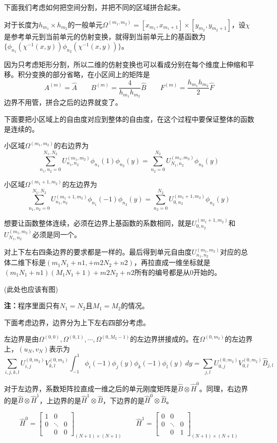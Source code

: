\documentclass[UTF8,12pt]{article}
\begin{document}
下面我们考虑如何把空间分割，并把不同的区域拼合起来。

对于长度为$h_{m_1} \times h_{m_2}$的一般单元$\Omega^{(m_1, m_2)} = [x_{m_1}, x_{m_1+1}] \times [y_{m_2}, y_{m_2+1}]$，设$\chi$是参考单元到当前单元的仿射变换，就得到当前单元上的基函数为$\{\phi_{n_1}(\chi^{-1}(x,y)) \phi_{n_2}(\chi^{-1}(x,y))\}$。

因为只考虑矩形分割，所以二维的仿射变换也可以看成分别在每个维度上伸缩和平移。积分变换的部分省略，在小区间上的矩阵是
$$ A^{(m)} = \hat{A} \qquad B^{(m)} = \frac{4}{h_{m_1} h_{m_2}} \hat{B} \qquad F^{(m)} = \frac{h_{m_1} h_{m_2}}{2} \hat{F} $$
边界不用管，拼合之后的边界就变了。

下面要把小区域上的自由度对应到整体的自由度，在这个过程中要保证整体的函数是连续的。

小区域$\Omega^{(m_1, m_2)}$的右边界为
$$ \sum_{n_1,n_2 = 0}^{N_1, N_2} U_{n_1,n_2}^{(m_1, m_2)} \phi_{n_1}(1) \phi_{n_2}(y) = \sum_{n_2 = 0}^{N_2} U_{N_1,n_2}^{(m_1, m_2)} \phi_{n_2}(y) $$

小区域$\Omega^{(m_1+1, m_2)}$的左边界为
$$ \sum_{n_1,n_2 = 0}^{N_1, N_2} U_{n_1,n_2}^{(m_1+1, m_2)} \phi_{n_1}(-1) \phi_{n_2}(y) = \sum_{n_2 = 0}^{N_2} U_{0,n_2}^{(m_1+1, m_2)} \phi_{n_2}(y) $$

想要让函数整体连续，必须在边界上基函数的系数相同，就是$U_{0,n_2}^{(m_1+1, m_2)}$和$U_{N_1,n_2}^{(m_1, m_2)}$必须是同一个。

对上下左右四条边界的要求都是一样的。最后得到单元自由度$U_{n_1,n_2}^{(m_1, m_2)}$对应的总体二维下标是$(m_1 N_1 + n1, + m2 N_2 + n2)$，再拉直成一维坐标就是$(m_1 N_1 + n1)(M_1 N_1 + 1) + m2 N_2 + n2$所有的编号都是从0开始的。

(此处也应该有图)

\textbf{注：}程序里面只有$N_1 = N_2$且$M_1 = M_2$的情况。

下面考虑边界，边界分为上下左右四部分考虑。

左边界是由$\Omega^{(0, 0)}, \Omega^{(0, 1)}, \cdots, \Omega^{(0, M_2-1)}$的左边界拼接成的。在$\Omega^{(0, m_2)}$的左边界上，$(u_N, v_N)$表示为
$$ \sum_{i,j,k,l} U_{i,j}^{(0, m_2)} V_{k,l}^{(0, m_2)} \int_{-1}^{1} \phi_i(-1) \phi_j(y) \phi_k(-1) \phi_l(y) \ dy = \sum_{j,l} U_{0,j}^{(0, m_2)} V_{0,l}^{(0, m_2)} \hat{B}_{j,l} $$

对于左边界，系数矩阵拉直成一维之后的单元刚度矩阵是$\hat{B} \otimes \hat{H}^0$。同理，右边界的是$\hat{B} \otimes \hat{H}^1$，上边界的是$\hat{H}^1 \otimes \hat{B}$，下边界的是$\hat{H}^0 \otimes \hat{B}$。

\begin{equation}
\hat{H}^0 = \left[ \begin{array}{ccc}
1 & 0 &  \\ 
0 & \ddots & 0 \\ 
& 0 & 0
\end{array} \right]_{(N+1) \times (N+1)}
\qquad
\hat{H}^1 = \left[ \begin{array}{ccc}
0 & 0 &  \\ 
0 & \ddots & 0 \\ 
& 0 & 1
\end{array} \right]_{(N+1) \times (N+1)}
\end{equation}
\end{document}
